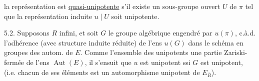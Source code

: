 la représentation  est \uline{quasi-unipotente} s'il existe un sous-groupe ouvert $U$ de $\pi$ tel que la représentation induite $u\mid U$ soit unipotente.

5.2. Supposons $R$ infini, et soit $G$ le groupe algébrique engendré par $u(\pi)$,  c.à.d. l'adhérence (avec structure induite réduite) de l'ens $u(G)$ dans le schéma en groupes des autom. de $E$. Comme l'ensemble des   unipotents  une partie Zariski-fermée de l'ens $\operatorname{Aut}(E)$, il s'ensuit que $u$ est unipotent ssi $G$ est unipotent, (i.e. chacun de ses éléments  est un automorphisme unipotent de $E_{\overline R}$).

